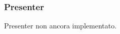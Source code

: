 \documentclass[../Funzionalita.tex]{subfiles}
\begin{document}
			
			
			
		
		
		\subsubsection{Presenter}
			Presenter non ancora implementato.
			
				
				
			
			
					
					
\end{document}
